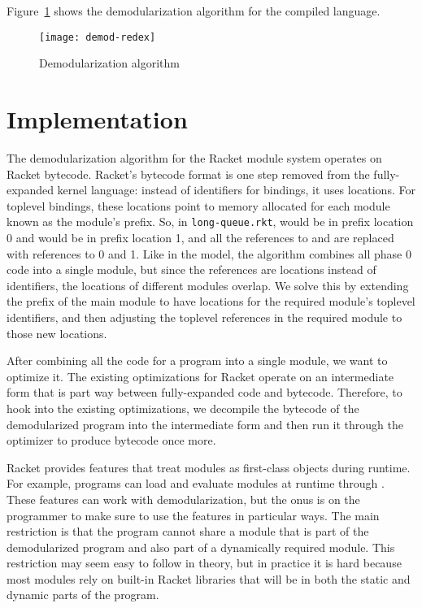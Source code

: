 \documentclass[ms,electronic,letterpaper,lol,lof,lot]{byumsphd}
\begin{document}
Figure~\ref{demod-redex} shows the demodularization algorithm for the compiled language.
\begin{figure}[h]
\texttt{[image: demod-redex]}
\caption{Demodularization algorithm}
\label{demod-redex}
\end{figure}

\chapter{Implementation}

The demodularization algorithm for the Racket module system operates on Racket bytecode. 
Racket's bytecode format is one step removed from the fully-expanded kernel language: instead of identifiers for bindings, it uses locations.
For toplevel bindings, these locations point to memory allocated for each module known as the module's prefix.
So, in \texttt{long-queue.rkt},  would be in prefix location 0 and  would be in prefix location 1, and all the references to  and  are replaced with references to 0 and 1.
Like in the model, the algorithm combines all phase 0 code into a single module, but since the references are locations instead of identifiers, the locations of different modules overlap.
We solve this by extending the prefix of the main module to have locations for the required module's toplevel identifiers, and then adjusting the toplevel references in the required module to those new locations. 

After combining all the code for a program into a single module, we want to optimize it.
The existing optimizations for Racket operate on an intermediate form that is part way between fully-expanded code and bytecode. 
Therefore, to hook into the existing optimizations, we decompile the bytecode of the demodularized program into the intermediate form and then run it through the optimizer to produce bytecode once more.

Racket provides features that treat modules as first-class objects during runtime. 
For example, programs can load and evaluate modules at runtime through . 
These features can work with demodularization, but the onus is on the programmer to make sure to use the features in particular ways.
The main restriction is that the program cannot share a module that is part of the demodularized program and also part of a dynamically required module. 
This restriction may seem easy to follow in theory, but in practice it is hard because most modules rely on built-in Racket libraries that will be in both the static and dynamic parts of the program.
\end{document}
